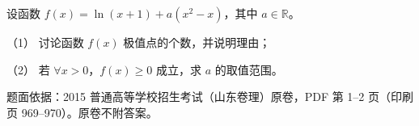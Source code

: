 \begin{question}

设函数 $f(x)=\ln(x+1)+a(x^2-x)$，其中 $a\in\mathbb{R}$。

（1） 讨论函数 $f(x)$ 极值点的个数，并说明理由；

（2） 若 $\forall x>0$，$f(x)\geqslant 0$ 成立，求 $a$ 的取值范围。

\par\medskip

\begin{gktip}
题面依据：2015 普通高等学校招生考试（山东卷理）原卷，PDF 第 1–2 页（印刷页 969–970）。原卷不附答案。
\end{gktip}

\end{question}